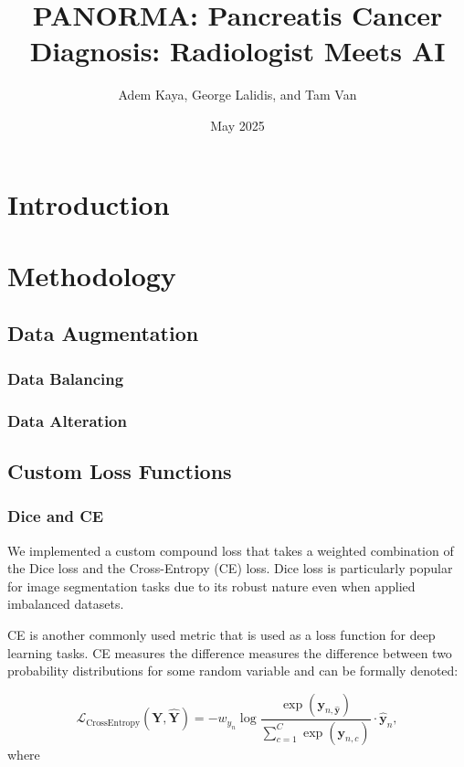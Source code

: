 \documentclass[12pt]{article}
\title{PANORMA: Pancreatis Cancer Diagnosis: Radiologist Meets AI}
\author{Adem Kaya, George Lalidis, and Tam Van}
\date{May 2025}
\begin{document}
\maketitle

\section{Introduction}

\section{Methodology}

\subsection{Data Augmentation}
\subsubsection{Data Balancing}
\subsubsection{Data Alteration}

\subsection{Custom Loss Functions}
\subsubsection{Dice and CE}
We implemented a custom compound loss that takes a weighted combination of the Dice loss and the Cross-Entropy 
(CE) loss. Dice loss is particularly popular for image segmentation tasks due to its robust nature even when applied
imbalanced datasets. 

CE is another commonly used metric that is used as a loss function for deep learning tasks. CE measures the difference
measures the difference between two probability distributions for some random variable and can be formally denoted:

\begin{equation}
\mathcal{L}_{\mathrm{CrossEntropy}}(\mathbf{Y}, \hat{\mathbf{Y}}) = -w_{y_n} \log\frac{\exp(\mathbf{y}_{n, \hat{\mathbf{y}}})}{\sum_{c=1}^{C} \exp(\mathbf{y}_{n,c})} \cdot \hat{\mathbf{y}}_n,
\end{equation}
where 
\end{document}
